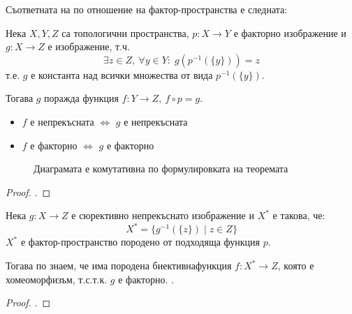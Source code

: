 Съответната на  по отношение на фактор-пространства е следната:
\begin{theorem}\label{th:factor-continuous}
    Нека $X, Y, Z$ са топологични пространства, $p: X \to Y$ е факторно изображение и $g: X \to Z$ е изображение, т.ч.
    \begin{equation}
        \exists z \in Z,\ \forall y \in Y:\; g(p^{-1}(\{y\})) = z
    \end{equation}
    т.е. $g$ е константа над всички множества от вида $p^{-1}(\{y\})$.

    Тогава $g$ поражда функция $f: Y \to Z,\ f \circ p = g$.
    \begin{itemize}
        \item $f$ е непрекъсната $\iff$ $g$ е непрекъсната
        \item $f$ е факторно $\iff$ $g$ е факторно
    \end{itemize}

    \begin{figure}[H]
        \centering
        \caption{Диаграмата е комутативна по формулировката на теоремата}
    \end{figure}
\end{theorem}
\begin{proof}
    \cite[стр.~142]{munkrestopology}.
\end{proof}
\begin{corollary}
    Нека $g: X \to Z$ е сюрективно непрекъснато изображение и $X^*$ е такова, че:
    \begin{equation}
        X^* = \{g^{-1}(\{z\}) \mid z \in Z\}
    \end{equation}
    $X^*$ е фактор-пространство породено от подходяща функция $p$.

    Тогава по  знаем, че има породена биективна\footnotemark  функция $f: X^* \to Z$, която е хомеоморфизъм, т.с.т.к. $g$ е факторно.  
    .
\end{corollary}
\begin{proof}
    \cite[стр.~142-143]{munkrestopology}.
\end{proof}


